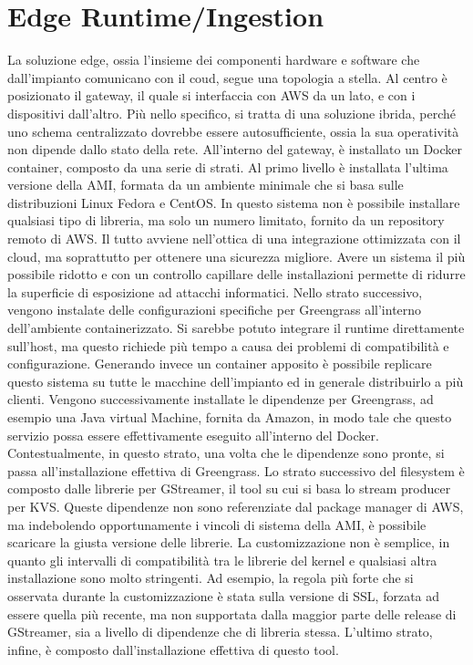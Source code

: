 \section{Edge Runtime/Ingestion}

La soluzione edge, ossia l'insieme dei componenti hardware e software che dall'impianto comunicano con il coud, segue una topologia a stella. Al centro è posizionato il gateway, il quale si interfaccia con AWS da un lato, e con i dispositivi dall'altro. Più nello specifico, si tratta di una soluzione ibrida, perché uno schema centralizzato dovrebbe essere autosufficiente, ossia la sua operatività non dipende dallo stato della rete. All'interno del gateway, è installato un Docker container, composto da una serie di strati. Al primo livello è installata l'ultima versione della AMI, formata da un ambiente minimale che si basa sulle distribuzioni Linux Fedora e CentOS. In questo sistema non è possibile installare qualsiasi tipo di libreria, ma solo un numero limitato, fornito da un repository remoto di AWS. Il tutto avviene nell'ottica di una integrazione ottimizzata con il cloud, ma soprattutto per ottenere una sicurezza migliore. Avere un sistema il più possibile ridotto e con un controllo capillare delle installazioni permette di ridurre la superficie di esposizione ad attacchi informatici. Nello strato successivo, vengono instalate delle configurazioni specifiche per Greengrass all'interno dell'ambiente containerizzato. Si sarebbe potuto integrare il runtime direttamente sull'host, ma questo richiede più tempo a causa dei problemi di compatibilità e configurazione. Generando invece un container apposito è possibile replicare questo sistema su tutte le macchine dell'impianto ed in generale distribuirlo a più clienti. Vengono successivamente installate le dipendenze per Greengrass, ad esempio una Java virtual Machine, fornita da Amazon, in modo tale che questo servizio possa essere effettivamente eseguito all'interno del Docker. Contestualmente, in questo strato, una volta che le dipendenze sono pronte, si passa all'installazione effettiva di Greengrass. Lo strato successivo del filesystem è composto dalle librerie per GStreamer, il tool su cui si basa lo stream producer per KVS. Queste dipendenze non sono referenziate dal package manager di AWS, ma indebolendo opportunamente i vincoli di sistema della AMI, è possibile scaricare la giusta versione delle librerie. La customizzazione non è semplice, in quanto gli intervalli di compatibilità tra le librerie del kernel e qualsiasi altra installazione sono molto stringenti. Ad esempio, la regola più forte che si osservata durante la customizzazione è stata sulla versione di SSL, forzata ad essere quella più recente, ma non supportata dalla maggior parte delle release di GStreamer, sia a livello di dipendenze che di libreria stessa. L'ultimo strato, infine, è composto dall'installazione effettiva di questo tool.







